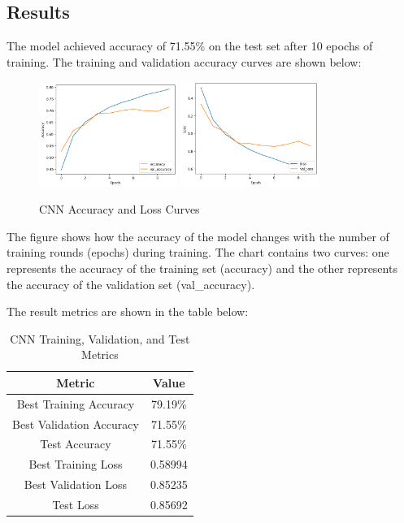 \documentclass[12pt]{article}
\begin{document}
\subsection{Results}
The model achieved accuracy of 71.55\% on the test set after 10 epochs of training. 
The training and validation accuracy curves are shown below:
\begin{figure}[H]
    \centering
    \includegraphics[width=0.4\textwidth]{./src/cnn_accuracy.png}
    \includegraphics[width=0.4\textwidth]{./src/cnn_loss.png}
    \caption{CNN Accuracy and Loss Curves}
\end{figure}
The figure shows how the accuracy of the model changes with the number of training rounds (epochs) during training. 
The chart contains two curves: one represents the accuracy of the training set (accuracy) and the other represents the accuracy of the validation set (val\_accuracy).

The result metrics are shown in the table below:
\begin{table}[H]
    \centering
    \begin{tabular}{c|c}
        \hline
        Metric & Value \\
        \hline
        Best Training Accuracy & 79.19\% \\
        Best Validation Accuracy & 71.55\% \\
        Test Accuracy & 71.55\% \\
        Best Training Loss & 0.58994 \\
        Best Validation Loss & 0.85235 \\
        Test Loss & 0.85692 \\
        \hline
    \end{tabular}
    \caption{CNN Training, Validation, and Test Metrics}
\end{table}
\end{document}
